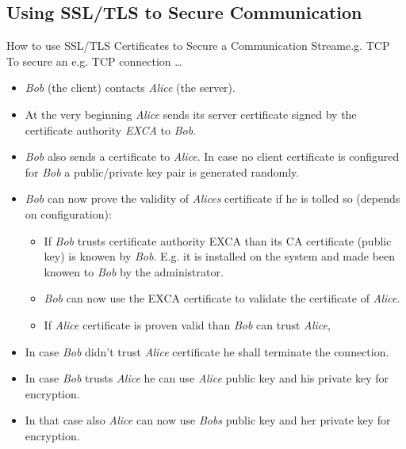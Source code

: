 ﻿\subsection{Using SSL/TLS to Secure Communication}

\begin{frame}{How to use SSL/TLS Certificates to Secure a Communication Stream}{e.g. TCP}
    To secure an e.g. TCP connection \ldots
    \begin{itemize}
        \item \alert{\textit{Bob}} (the client) contacts \alert{\textit{Alice}} (the server).
        \item  At the very beginning \alert{\textit{Alice}} sends its \alert{server certificate} signed by the \alert{certificate authority \textit{EXCA}} to \textit{Bob}.
        \item \alert{\textit{Bob} also sends a certificate} to \textit{Alice}. In case no \alert{client} certificate is configured for \textit{Bob} a public/private key pair is generated randomly.
        \item \textit{Bob} can now \alert{prove} the \alert{validity} of \textit{Alices} \alert{certificate} if he is tolled so (depends on \alert{configuration}):
        \begin{itemize}
            \item If \textit{Bob} \alert{trusts} certificate authority \alert{EXCA} than its \alert{CA certificate (public key) is knowen} by \textit{Bob}. E.g. it is installed on the system and made been knowen to \textit{Bob} by the \alert{administrator}.
            \item \textit{Bob} can now \alert{use the EXCA certificate} to \alert{validate} the \alert{certificate of \textit{Alice}}.
            \item If \textit{Alice} certificate is \alert{proven valid} than \textit{Bob} \alert{can trust} \textit{Alice},
        \end{itemize}
        \item In case \textit{Bob} \alert{didn't trust} \textit{Alice} certificate he shall \alert{terminate the connection}.
        \item In case \textit{Bob} \alert{trusts} \textit{Alice} he can use \alert{\textit{Alice} public key and his private key} for encryption.
        \item In that case also \textit{Alice} can now use \alert{\textit{Bobs} public key and her private key} for encryption.
    \end{itemize}
\end{frame}
